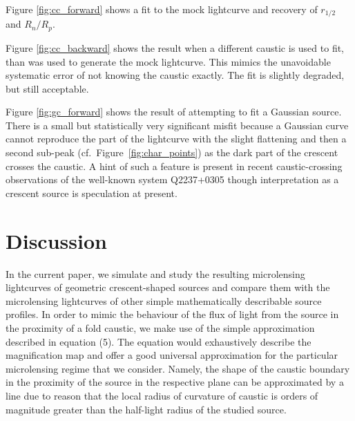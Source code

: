 \documentclass[usenatbib]{mn2e}
\begin{document}
Figure \ref{fig:cc_forward} shows a fit to the mock lightcurve and
recovery of $r_{1/2}$ and $R_n/R_p$.

Figure \ref{fig:cc_backward} shows the result when a different caustic
is used to fit, than was used to generate the mock lightcurve.  This
mimics the unavoidable systematic error of not knowing the caustic
exactly.  The fit is slightly degraded, but still acceptable.

Figure \ref{fig:gc_forward} shows the result of attempting to fit a
Gaussian source.  There is a small but statistically very significant
misfit because a Gaussian curve cannot reproduce the part of the
lightcurve with the slight flattening and then a second sub-peak
(cf.~Figure~\ref{fig:char_points}) as the dark part of the crescent crosses the caustic.  
A hint of
such a feature is present in recent caustic-crossing observations of
the well-known system Q2237+0305 \citep[see Figure~3
in][]{2015ApJ...814L..26M} though interpretation as a crescent source
is speculation at present.

\section{Discussion}\label{sec:discussion}

In the current paper, we simulate and study the resulting microlensing lightcurves of geometric crescent-shaped sources 
and compare them with the microlensing lightcurves of other simple mathematically describable source profiles. 
In order to mimic the behaviour of the flux of light from the source in the proximity of a fold caustic, 
we make use of the simple approximation described in equation (5). 
The equation would exhaustively describe the magnification map and offer a good universal approximation for the 
particular microlensing regime that we consider. 
Namely, the shape of the caustic boundary in the proximity of the source in the respective plane can be approximated by
 a line due to reason that the local radius of curvature of caustic is orders of magnitude greater than the half-light
 radius of the studied source. 
\end{document}
